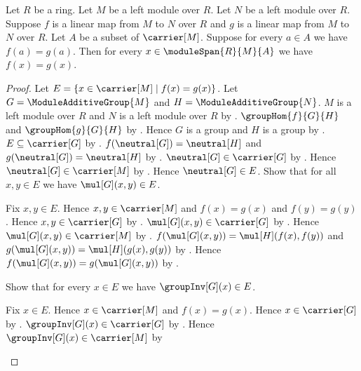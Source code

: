 \begin{theorem}\label{linear_maps_agree_on_span}
    Let $R$ be a ring.
    Let $M$ be a left module over $R$.
    Let $N$ be a left module over $R$.
    Suppose $f$ is a linear map from $M$ to $N$ over $R$ and
        $g$ is a linear map from $M$ to $N$ over $R$.
    Let $A$ be a subset of $\carrier[M]$.
    Suppose for every $a\in A$ we have $f(a)=g(a)$.
    Then for every $x\in\moduleSpan{R}{M}{A}$ we have $f(x)=g(x)$.
\end{theorem}
\begin{proof}
    Let $E=\{x\in\carrier[M]\mid f(x)=g(x)\}$.
    Let $G=\ModuleAdditiveGroup{M}$ and
        $H=\ModuleAdditiveGroup{N}$.
    $M$ is a left module over $R$ and
        $N$ is a left module over $R$ by
        .
    $\groupHom{f}{G}{H}$ and $\groupHom{g}{G}{H}$ by
        .
    Hence $G$ is a group and $H$ is a group by
        .
    $E\subseteq\carrier[G]$ by
        .
    $f(\neutral[G])=\neutral[H]$ and
        $g(\neutral[G])=\neutral[H]$ by .
    $\neutral[G]\in\carrier[G]$ by
        .
    Hence $\neutral[G]\in\carrier[M]$ by
        .
    Hence $\neutral[G]\in E$.
    Show that for all $x,y\in E$ we have $\mul[G](x,y)\in E$.
    \begin{subproof}
        Fix $x,y\in E$.
        Hence $x,y\in\carrier[M]$ and
            $f(x)=g(x)$ and $f(y)=g(y)$.
        Hence $x,y\in\carrier[G]$ by .
        $\mul[G](x,y)\in\carrier[G]$ by
            .
        Hence $\mul[G](x,y)\in\carrier[M]$ by
            .
        $f(\mul[G](x,y))=\mul[H](f(x),f(y))$ and
            $g(\mul[G](x,y))=\mul[H](g(x),g(y))$ by
            .
        Hence $f(\mul[G](x,y))=g(\mul[G](x,y))$ by \auto.
    \end{subproof}
    Show that for every $x\in E$ we have $\groupInv[G](x)\in E$.
    \begin{subproof}
        Fix $x\in E$.
        Hence $x\in\carrier[M]$ and $f(x)=g(x)$.
        Hence $x\in\carrier[G]$ by .
        $\groupInv[G](x)\in\carrier[G]$ by
            .
        Hence $\groupInv[G](x)\in\carrier[M]$ by

\end{subproof}
\end{proof}
